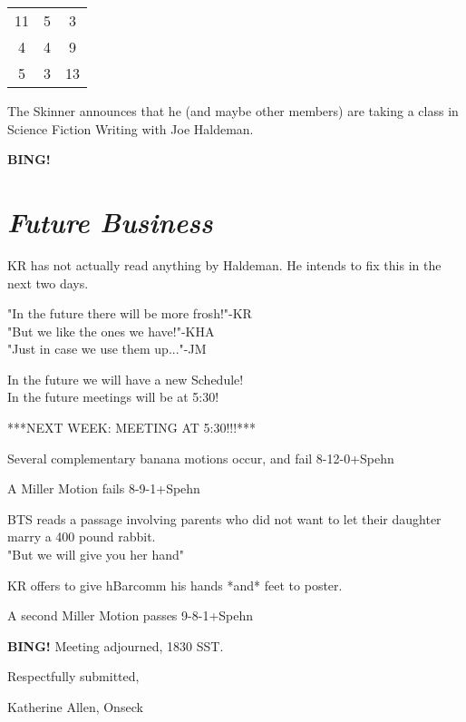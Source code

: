 \documentclass[10pt]{article}
\newcommand{\bing}{{\bf BING!} }
\newcommand{\goto}[1]{\bing \vskip 12pt \section*{{\em{#1}}}}
\begin{document}
\begin{tabular}{|c|c|c|}
11 & 5 & 3\\
4 & 4 & 9\\
5 & 3 & 13\\
\end{tabular}


The Skinner announces that he (and maybe other members) are taking a
class in Science Fiction Writing with Joe Haldeman.

\goto{Future Business}
KR has not actually read anything by Haldeman. He intends to fix this
in the next two days.

"In the future there will be more frosh!"-KR\\
"But we like the ones we have!"-KHA\\
"Just in case we use them up..."-JM

In the future we will have a new Schedule!\\
In the future meetings will be at 5:30!

***NEXT WEEK: MEETING AT 5:30!!!***

Several complementary banana motions occur, and fail 8-12-0+Spehn

A Miller Motion fails 8-9-1+Spehn

BTS reads a passage involving parents who did not want to let their
daughter marry a 400 pound rabbit.\\
"But we will give you her hand"

KR offers to give hBarcomm his hands *and* feet to poster.

A second Miller Motion passes 9-8-1+Spehn

\bing
\noindent
Meeting adjourned, 1830 SST.

\vspace{18pt}

\centerline{Respectfully submitted,}
\centerline{Katherine Allen, Onseck}
\end{document}
